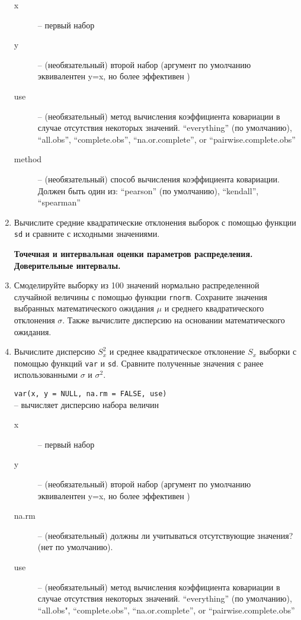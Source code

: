 \begin{enumerate}
\begin{mdframed}[style=BadassFrame]
\begin{description}
                \item[x] -- первый набор
                \item[y] -- (необязательный) второй набор (аргумент по умолчанию эквивалентен y=x, но более эффективен )
                \item[use] -- (необязательный) метод вычисления коэффициента ковариации в случае отсутствия некоторых значений.
                    ``everything'' (по умолчанию), ``all.obs'', ``complete.obs'', ``na.or.complete'', or ``pairwise.complete.obs''
                \item[method] -- (необязательный) способ вычисления коэффициента ковариации. Должен быть один из: 
                    ``pearson'' (по умолчанию), ``kendall'', ``spearman''
              \end{description}
          \end{mdframed}

    \item Вычислите средние квадратические отклонения выборок с помощью функции \texttt{sd} и сравните
          с исходными значениями.


    \textbf{Точечная и интервальная оценки параметров распределения. Доверительные интервалы.}

    \item Смоделируйте выборку из 100 значений нормально распределенной случайной величины с помощью
          функции \texttt{rnorm}. Сохраните значения выбранных математического ожидания $\mu$ и 
          среднего квадратического отклонения $\sigma$. Также вычислите дисперсию на основании математического 
          ожидания.

    \item Вычислите дисперсию $S_x^2$ и среднее квадратическое отклонение $S_x$ выборки с помощью 
          функций \texttt{var} и \texttt{sd}. Сравните полученные значения с ранее использованными 
          $\sigma$ и $\sigma^2$.

          \begin{mdframed}[style=BadassFrame]

              \texttt{var(x, y = NULL, na.rm = FALSE, use)} \\ -- вычисляет дисперсию набора величин
              \begin{description}

                \item[x] -- первый набор
                \item[y] -- (необязательный) второй набор (аргумент по умолчанию эквивалентен y=x, но более эффективен )
                \item[na.rm] -- (необязательный) должны ли учитываться отсутствующие значения? (нет по умолчанию).
                \item[use] -- (необязательный) метод вычисления коэффициента ковариации в случае отсутствия некоторых значений.
                    ``everything'' (по умолчанию), ``all.obs", ``complete.obs'', ``na.or.complete'', or ``pairwise.complete.obs''
              \end{description}
          \end{mdframed}


\end{enumerate}
